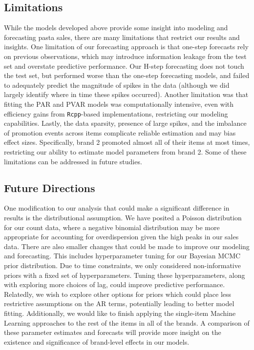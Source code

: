 \documentclass{article}
\begin{document}
\subsection{Limitations}

\noindent While the models developed above provide some insight into modeling and forecasting pasta sales, there are many limitations that restrict our results and insights. One limitation of our forecasting approach is that one-step forecasts rely on previous observations, which may introduce information leakage from the test set and overstate predictive performance. Our H-step forecasting does not touch the test set, but performed worse than the one-step forecasting models, and failed to adequately predict the magnitude of spikes in the data (although we did largely identify where in time these spikes occurred). Another limitation was that fitting the PAR and PVAR models was computationally intensive, even with efficiency gains from \texttt{Rcpp}-based implementations, restricting our modeling capabilities. Lastly, the data sparsity, presence of large spikes, and the imbalance of promotion events across items complicate reliable estimation and may bias effect sizes. Specifically, brand 2 promoted almost all of their items at most times, restricting our ability to estimate model parameters from brand 2. Some of these limitations can be addressed in future studies. 

\subsection{Future Directions}

\noindent One modification to our analysis that could make a significant difference in results is the distributional assumption. We have posited a Poisson distribution for our count data, where a negative binomial distribution may be more appropriate for accounting for overdispersion given the high peaks in our sales data. There are also smaller changes that could be made to improve our modeling and forecasting. This includes hyperparameter tuning for our Bayesian MCMC prior distribution. Due to time constraints, we only considered non-informative priors with a fixed set of hyperparameters. Tuning these hyperparameters, along with exploring more choices of lag,  could improve predictive performance. Relatedly, we wish to explore other options for priors which could place less restrictive assumptions on the AR terms, potentially leading to better model fitting. Additionally, we would like to finish applying the single-item Machine Learning approaches to the rest of the items in all of the brands. A comparison of these parameter estimates and forecasts will provide more insight on the existence and significance of brand-level effects in our models. 
\end{document}

